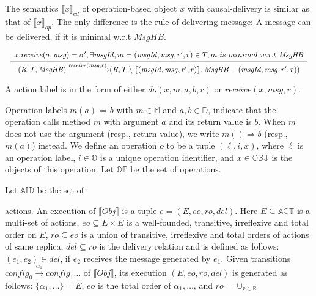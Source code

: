 The semantics $\llbracket x \rrbracket_{\mathit{cd}}$ of operation-based object $x$ with causal-delivery is similar as that of $\llbracket x \rrbracket_{\mathit{op}}$. The only difference is the rule of delivering message: A message can be delivered, if it is minimal w.r.t $\mathit{MsgHB}$.

$\begin{array}{l c}
   \bigfrac{
   \begin{array}{c}
      x.\mathit{receive}(\sigma,\mathit{msg}) = \sigma',\exists \mathit{msgId}, m = (\mathit{msgId},\mathit{msg},r',r) \in T, m \ is \ minimal \ w.r.t \ \mathit{MsgHB}
   \end{array}}
     {(R,T,\mathit{MsgHB}) {\xrightarrow{\mathit{receive}(\mathit{msg},r)}} (R,T \setminus \{ (\mathit{msgId},\mathit{msg},r',r) \},\mathit{MsgHB} - (\mathit{msgId},\mathit{msg},r',r) )}
\end{array}$ 















A action label is in the form of either $\mathit{do}(x,m,a,b,r)$ or $\mathit{receive}(x,\mathit{msg},r)$.

Operation labels \mbox{$m(a)\Rightarrow b$} with $m \in \mathbb{M}$ and $a,b \in \mathbb{D}$, indicate that the operation calls method $m$ with argument $a$ and its return value is $b$. When $m$ does not use the argument (resp., return value), we write $m()\Rightarrow b$ (resp., $m(a)$) instead. We define an operation $o$ to be a tuple $(\ell,i,x)$, where $\ell$ is an operation label, $i \in \mathbb{O}$ is a unique operation identifier, and $x \in \mathbb{OBJ}$ is the objects of this operation. Let $\mathbb{OP}$ be the set of operations.

Let $\mathbb{AID}$ be the set of


actions. An execution of $\llbracket \mathit{Obj} \rrbracket$ is a tuple $e = (E,\mathit{eo},\mathit{ro},\mathit{del})$. Here $E \subseteq \mathbb{ACT}$ is a multi-set of actions, $\mathit{eo} \subseteq E \times E$ is a well-founded, transitive, irreflexive and total order on $E$, $\mathit{ro} \subseteq \mathit{eo}$ is a union of transitive, irreflexive and total orders of actions of same replica, $\mathit{del} \subseteq \mathit{ro}$ is the delivery relation and is defined as follows: $(e_1,e_2) \in \mathit{del}$, if $e_2$ receives the message generated by $e_1$. Given transitions $\mathit{config}_0  {\xrightarrow{\alpha_1}} \mathit{config}_1 \ldots$ of $\llbracket \mathit{Obj} \rrbracket$, its execution $(E,\mathit{eo},\mathit{ro},\mathit{del})$ is generated as follows: $\{ \alpha_1,\ldots \} = E$, $\mathit{eo}$ is the total order of $\alpha_1,\ldots$, and $\mathit{ro} = \cup_{r \in \mathbb{R}} $



